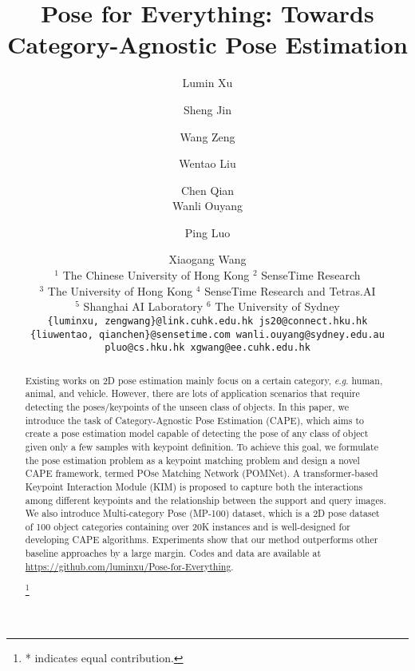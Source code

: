 \documentclass[runningheads]{llncs}
\newcommand{\eg}{\textit{e}.\textit{g}. }
\newcommand\blfootnote[1]{\begingroup
\renewcommand\thefootnote{}\footnote{#1}\addtocounter{footnote}{-1}\endgroup
}
\begin{document}
\pagestyle{headings}
\mainmatter
\def\ECCVSubNumber{6672}  

\title{Pose for Everything: Towards Category-Agnostic Pose Estimation} 

\begin{comment}
\titlerunning{ECCV-22 submission ID \ECCVSubNumber} 
\authorrunning{ECCV-22 submission ID \ECCVSubNumber} 
\author{Anonymous ECCV submission}
\institute{Paper ID \ECCVSubNumber}
\end{comment}


\author{Lumin Xu \and Sheng Jin \and Wang Zeng \and	Wentao Liu \and	Chen Qian \\ Wanli Ouyang \and Ping Luo \and Xiaogang Wang \\[.21cm]
	$^{1}$ The Chinese University of Hong Kong \quad
	$^{2}$ SenseTime Research \\
	$^{3}$ The University of Hong Kong \quad
	$^{4}$ SenseTime Research and Tetras.AI  \\
	$^{5}$ Shanghai AI Laboratory \quad
	$^{6}$ The University of Sydney \\
	\tt\small \{luminxu, zengwang\}@link.cuhk.edu.hk \quad js20@connect.hku.hk \\
	\{liuwentao, qianchen\}@sensetime.com \quad wanli.ouyang@sydney.edu.au \quad pluo@cs.hku.hk \quad xgwang@ee.cuhk.edu.hk}
\institute{}
\maketitle



\begin{abstract}

Existing works on 2D pose estimation mainly focus on a certain category, \eg human, animal, and vehicle. However, there are lots of application scenarios that require detecting the poses/keypoints of the unseen class of objects. 
In this paper, we introduce the task of Category-Agnostic Pose Estimation (CAPE), which aims to create a pose estimation model capable of detecting the pose of any class of object given only a few samples with keypoint definition.
To achieve this goal, we formulate the pose estimation problem as a keypoint matching problem and design a novel CAPE framework, termed POse Matching Network (POMNet). A transformer-based Keypoint Interaction Module (KIM) is proposed to capture both the interactions among different keypoints and the relationship between the support and query images.
We also introduce Multi-category Pose (MP-100) dataset, which is a 2D pose dataset of 100 object categories containing over 20K instances and is well-designed for developing CAPE algorithms. 
Experiments show that our method outperforms other baseline approaches by a large margin.
Codes and data are available at \url{https://github.com/luminxu/Pose-for-Everything}.
 

\blfootnote{* indicates equal contribution.}

\end{abstract}
\end{document}

